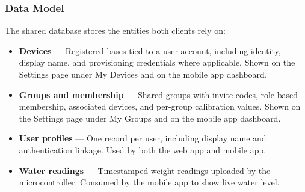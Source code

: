 \subsubsection{Data Model}
The shared database stores the entities both clients rely on:

\begin{itemize}
    \item \textbf{Devices} --- Registered bases tied to a user account, including identity, display name, and provisioning credentials where applicable. Shown on the Settings page under My Devices and on the mobile app dashboard.
    \item \textbf{Groups and membership} --- Shared groups with invite codes, role-based membership, associated devices, and per-group calibration values. Shown on the Settings page under My Groups and on the mobile app dashboard.
    \item \textbf{User profiles} --- One record per user, including display name and authentication linkage. Used by both the web app and mobile app.
    \item \textbf{Water readings} --- Timestamped weight readings uploaded by the microcontroller. Consumed by the mobile app to show live water level.
\end{itemize}
